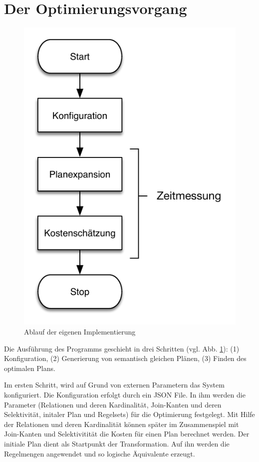 \section{Der Optimierungsvorgang}

\begin{figure}[h]
  \centering
  \includegraphics{04_Implementierung/00_media/Ablauf.pdf}
  \caption{Ablauf der eigenen Implementierung}
  \label{Ablauf}
\end{figure}

Die Ausführung des Programms geschieht in drei Schritten (vgl. Abb. \ref{Ablauf}): (1) Konfiguration, (2) Generierung von semantisch gleichen Plänen, (3) Finden des optimalen Plans.




Im ersten Schritt, wird auf Grund von externen Parametern das System konfiguriert. Die Konfiguration erfolgt durch ein JSON File. In ihm werden die Parameter (Relationen und deren Kardinalität, Join-Kanten und deren Selektivität, initaler Plan und Regelsets) für die Optimierung festgelegt. Mit Hilfe der Relationen und deren Kardinalität können später im Zusammenspiel mit Join-Kanten und Selektivitität die Kosten für einen Plan berechnet werden. Der initiale Plan dient als Startpunkt der Transformation. Auf ihn werden die Regelmengen angewendet und so logische  Äquivalente erzeugt.

